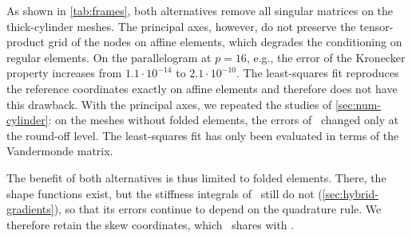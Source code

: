As shown in \cref{tab:frames}, both alternatives remove all singular matrices on the thick-cylinder meshes. The principal axes, however, do not preserve the tensor-product grid of the nodes on affine elements, which degrades the conditioning on regular elements. On the parallelogram at $p=16$, e.g., the error of the Kronecker property increases from $1.1\cdot10^{-14}$ to $2.1\cdot10^{-10}$. The least-squares fit reproduces the reference coordinates exactly on affine elements and therefore does not have this drawback. With the principal axes, we repeated the studies of \cref{sec:num-cylinder}: on the meshes without folded elements, the errors of \PH\ changed only at the round-off level. The least-squares fit has only been evaluated in terms of the Vandermonde matrix.

The benefit of both alternatives is thus limited to folded elements. There, the shape functions exist, but the stiffness integrals of \PH\ still do not (\cref{sec:hybrid-gradients}), so that its errors continue to depend on the quadrature rule. We therefore retain the skew coordinates, which \PH\ shares with \PM.
